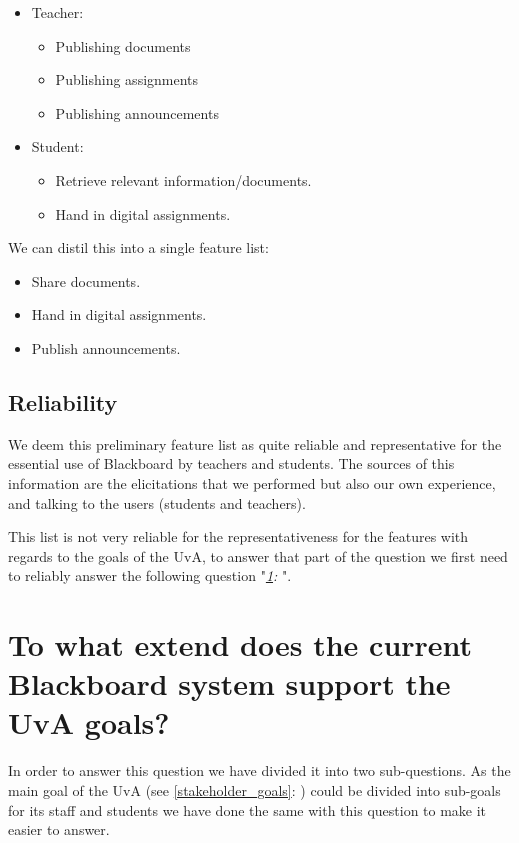 \begin{itemize}
	\item Teacher:
	\begin{itemize}
		\item Publishing documents
		\item Publishing assignments
		\item Publishing announcements
	\end{itemize}

	\item Student:
	\begin{itemize}
		\item Retrieve relevant information/documents.
		\item Hand in digital assignments.
	\end{itemize}
\end{itemize}

We can distil this into a single feature list:
\begin{itemize}
	\item Share documents.
	\item Hand in digital assignments.
	\item Publish announcements.
\end{itemize}

\subsection{Reliability}
We deem this preliminary feature list as quite reliable and representative for the essential use of Blackboard by teachers and students. The sources of this information are the elicitations that we performed but also our own experience, and talking to the users (students and teachers).

This list is not very reliable for the representativeness for the features with regards to the goals of the UvA, to answer that part of the question we first need to reliably answer the following question "\emph{\ref{uva_goal_question}: }".


\section{To what extend does the current Blackboard system support the UvA goals?} \label{uva_goal_question}
In order to answer this question we have divided it into two sub-questions. As the main goal of the UvA (see \ref{stakeholder_goals}: ) could be divided into sub-goals for its staff and students we have done the same with this question to make it easier to answer.

